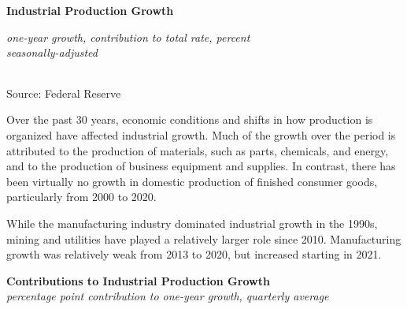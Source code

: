 \documentclass{report}
\newcommand{\tbllink}[1]{\href{https://raw.githubusercontent.com/bdecon/US-chartbook/master/chartbook/data/#1}{\faTable}}
\begin{document}
{\begin{minipage}{0.76\textwidth}
\normalsize \textbf{Industrial Production Growth}\\
\footnotesize{\textit{one-year growth, \hspace{27mm} contribution to total \hspace{10mm} rate, percent}\\
\footnotesize{\textit{seasonally-adjusted}}
\vspace*{-7mm}

\hspace*{-2mm}  \setlength{\tabcolsep}{3.7pt} \color{black!90}
		{\renewcommand{\arraystretch}{1.48}
		 \begin{tabular}{p{2mm} p{38mm} R{6.6mm} R{6.6mm} R{6.6mm} R{6.6mm} | 
		 R{6.8mm} R{6.6mm} R{6.6mm} R{6.6mm} }
			  \hline
		\end{tabular}}\vspace{-2mm}
		
\footnotesize{Source: Federal Reserve} \hfill \tbllink{indpro_table.csv}}
\end{minipage}
\newpage
\begin{minipage}{0.76\textwidth} 
\small Over the past 30 years, economic conditions and shifts in how production is organized have affected industrial growth. Much of the growth over the period is attributed to the production of materials, such as parts, chemicals, and energy, and to the production of business equipment and supplies. In contrast, there has been virtually no growth in domestic production of finished consumer goods, particularly from 2000 to 2020. 

While the manufacturing industry dominated industrial growth in the 1990s, mining and utilities have played a relatively larger role since 2010. Manufacturing growth was relatively weak from 2013 to 2020, but increased starting in 2021. 
\vspace{1mm}

\normalsize \textbf{Contributions to Industrial Production Growth}\\
\footnotesize{\textit{percentage point contribution to one-year growth, quarterly average}}
\vspace{2.6cm}


\end{minipage}}
\end{document}
